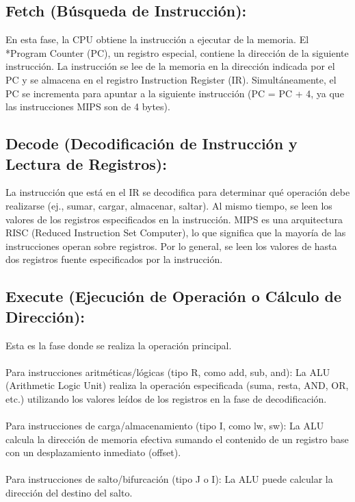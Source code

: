 \documentclass{article}
\begin{document}
\subsection{Fetch (Búsqueda de Instrucción):}
En esta fase, la CPU obtiene la instrucción a ejecutar de la memoria. El *Program Counter (PC), un registro especial, contiene la dirección de la siguiente instrucción. La instrucción se lee de la memoria en la dirección indicada por el PC y se almacena en el registro Instruction Register (IR). Simultáneamente, el PC se incrementa para apuntar a la siguiente instrucción (PC = PC + 4, ya que las instrucciones MIPS son de 4 bytes).
\subsection{Decode (Decodificación de Instrucción y Lectura de Registros):}
La instrucción que está en el IR se decodifica para determinar qué operación debe realizarse (ej., sumar, cargar, almacenar, saltar). Al mismo tiempo, se leen los valores de los registros especificados en la instrucción. MIPS es una arquitectura RISC (Reduced Instruction Set Computer), lo que significa que la mayoría de las instrucciones operan sobre registros. Por lo general, se leen los valores de hasta dos registros fuente especificados por la instrucción.
\subsection{Execute (Ejecución de Operación o Cálculo de Dirección):}
Esta es la fase donde se realiza la operación principal.
\\
\\Para instrucciones aritméticas/lógicas (tipo R, como add, sub, and): La ALU (Arithmetic Logic Unit) realiza la operación especificada (suma, resta, AND, OR, etc.) utilizando los valores leídos de los registros en la fase de decodificación.
\\
\\ Para instrucciones de carga/almacenamiento (tipo I, como lw, sw): La ALU calcula la dirección de memoria efectiva sumando el contenido de un registro base con un desplazamiento inmediato (offset).
\\
\\Para instrucciones de salto/bifurcación (tipo J o I): La ALU puede calcular la dirección del destino del salto.
\end{document}
